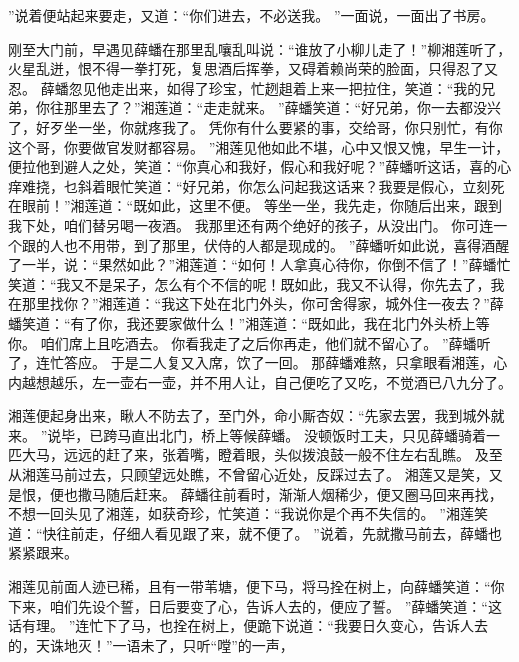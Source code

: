 ”说着便站起来要走，又道：“你们进去，不必送我。
”一面说，一面出了书房。
\par
刚至大门前，早遇见薛蟠在那里乱嚷乱叫说：“谁放了小柳儿走了！”柳湘莲听了，火星乱迸，恨不得一拳打死，复思酒后挥拳，又碍着赖尚荣的脸面，只得忍了又忍。
薛蟠忽见他走出来，如得了珍宝，忙趔趄着上来一把拉住，笑道：“我的兄弟，你往那里去了？”湘莲道：“走走就来。
”薛蟠笑道：“好兄弟，你一去都没兴了，好歹坐一坐，你就疼我了。
凭你有什么要紧的事，交给哥，你只别忙，有你这个哥，你要做官发财都容易。
”湘莲见他如此不堪，心中又恨又愧，早生一计，便拉他到避人之处，笑道：“你真心和我好，假心和我好呢？”薛蟠听这话，喜的心痒难挠，乜斜着眼忙笑道：“好兄弟，你怎么问起我这话来？我要是假心，立刻死在眼前！”湘莲道：“既如此，这里不便。
等坐一坐，我先走，你随后出来，跟到我下处，咱们替另喝一夜酒。
我那里还有两个绝好的孩子，从没出门。
你可连一个跟的人也不用带，到了那里，伏侍的人都是现成的。
”薛蟠听如此说，喜得酒醒了一半，说：“果然如此？”湘莲道：“如何！人拿真心待你，你倒不信了！”薛蟠忙笑道：“我又不是呆子，怎么有个不信的呢！既如此，我又不认得，你先去了，我在那里找你？”湘莲道：“我这下处在北门外头，你可舍得家，城外住一夜去？”薛蟠笑道：“有了你，我还要家做什么！”湘莲道：“既如此，我在北门外头桥上等你。
咱们席上且吃酒去。
你看我走了之后你再走，他们就不留心了。
”薛蟠听了，连忙答应。
于是二人复又入席，饮了一回。
那薛蟠难熬，只拿眼看湘莲，心内越想越乐，左一壶右一壶，并不用人让，自己便吃了又吃，不觉酒已八九分了。
\par
湘莲便起身出来，瞅人不防去了，至门外，命小厮杏奴：“先家去罢，我到城外就来。
”说毕，已跨马直出北门，桥上等候薛蟠。
没顿饭时工夫，只见薛蟠骑着一匹大马，远远的赶了来，张着嘴，瞪着眼，头似拨浪鼓一般不住左右乱瞧。
及至从湘莲马前过去，只顾望远处瞧，不曾留心近处，反踩过去了。
湘莲又是笑，又是恨，便也撒马随后赶来。
薛蟠往前看时，渐渐人烟稀少，便又圈马回来再找，不想一回头见了湘莲，如获奇珍，忙笑道：“我说你是个再不失信的。
”湘莲笑道：“快往前走，仔细人看见跟了来，就不便了。
”说着，先就撒马前去，薛蟠也紧紧跟来。
\par
湘莲见前面人迹已稀，且有一带苇塘，便下马，将马拴在树上，向薛蟠笑道：“你下来，咱们先设个誓，日后要变了心，告诉人去的，便应了誓。
”薛蟠笑道：“这话有理。
”连忙下了马，也拴在树上，便跪下说道：“我要日久变心，告诉人去的，天诛地灭！”一语未了，只听“嘡”的一声，
